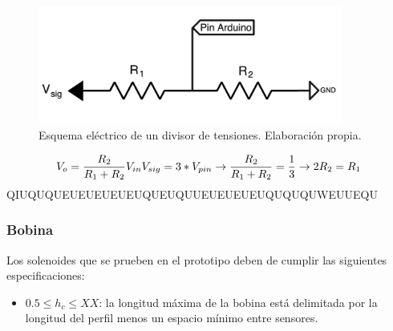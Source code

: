 \begin{figure}[H]
    \centering
    \includegraphics[width=10cm]{FigurasMemoria/divisorTensiones.png}
    \caption{Esquema eléctrico de un divisor de tensiones. Elaboración propia.}
    \label{fig:divisorTensiones} %
\end{figure}
\[
V_{o}=\frac{R_2}{R_1+R_2}V_{in}\\
V_{sig}=3*V_{pin}\to \frac{R_2}{R_1+R_2}=\frac{1}{3}\to 2R_2=R_1
\]
QIUQUQUEUEUEUEUEUQUEUQUUEUEUEUEUQUQUQUWEUUEQU
\subsubsection{Bobina}
\label{subsub:bobina}

Los solenoides que se prueben en el prototipo deben de cumplir las siguientes especificaciones:


\begin{itemize}
    \item \(0.5\leq h_{c} \leq XX\): la longitud máxima de la bobina está delimitada por la longitud del perfil menos un espacio mínimo entre sensores.
\end{itemize}
